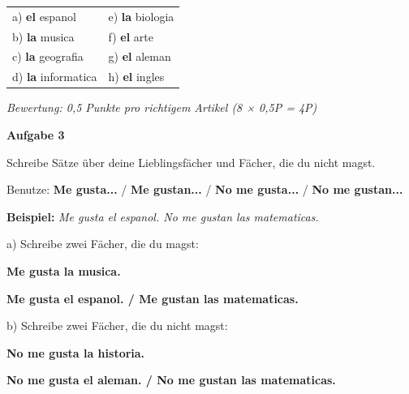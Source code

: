 \documentclass[11pt, a4paper]{article}
\newcommand{\fachfarbe}{spanisch}
\newcommand{\punktebox}[1]{\hfill\fbox{\small \_/#1}}
\newcommand{\loesung}[1]{\textcolor{loesung}{\textbf{#1}}}
\newenvironment{aufgabe}[1]{%
    \needspace{5\baselineskip}%
    \nopagebreak[4]%
    \vspace{10pt}
    \noindent\textbf{\textcolor{\fachfarbe}{Aufgabe #1}}
    \nopagebreak[4]%
    \vspace{5pt}
    \nopagebreak[4]%
    \begin{list}{}{\leftmargin=0pt}
    \item[]
}{%
    \end{list}
}
\newcommand{\es}[1]{\textcolor{\fachfarbe}{\textbf{#1}}}
\begin{document}
\vspace{0.5em}

\noindent
\begin{tabular}{p{7cm}p{7cm}}
a) \loesung{el} espanol & e) \loesung{la} biologia \\[0.8em]
b) \loesung{la} musica & f) \loesung{el} arte \\[0.8em]
c) \loesung{la} geografia & g) \loesung{el} aleman \\[0.8em]
d) \loesung{la} informatica & h) \loesung{el} ingles \\
\end{tabular}

\vspace{0.5em}

\textit{\textcolor{grau}{Bewertung: 0,5 Punkte pro richtigem Artikel (8 × 0,5P = 4P)}}

\vspace{15pt}


\begin{aufgabe}{3}
Schreibe Sätze über deine Lieblingsfächer und Fächer, die du nicht magst. \punktebox{6}
\end{aufgabe}

\begin{hinweis}
Benutze: \es{Me gusta...} / \es{Me gustan...} / \es{No me gusta...} / \es{No me gustan...}
\end{hinweis}

\vspace{0.5em}

\noindent
\textbf{Beispiel:} \textit{Me gusta el espanol. No me gustan las matematicas.}

\vspace{0.5em}

\noindent
a) Schreibe zwei Fächer, die du magst:

\loesung{Me gusta la musica.}

\loesung{Me gusta el espanol. / Me gustan las matematicas.}

\vspace{0.5em}

\noindent
b) Schreibe zwei Fächer, die du nicht magst:

\loesung{No me gusta la historia.}

\loesung{No me gusta el aleman. / No me gustan las matematicas.}
\end{document}
